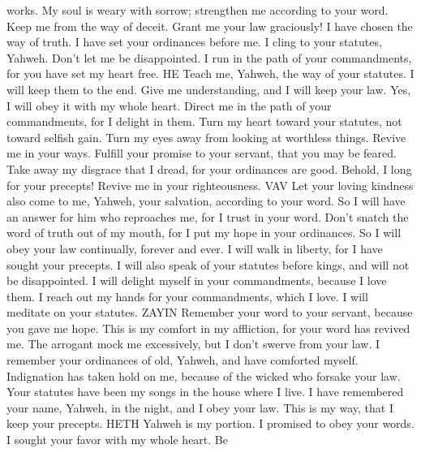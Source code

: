 works.  My soul is weary with sorrow; strengthen me
according to your word.  Keep me from the way of deceit.
Grant me your law graciously!  I have chosen the way of
truth. I have set your ordinances before me.  I cling to
your statutes, Yahweh. Don't let me be disappointed.  I
run in the path of your commandments, for you have set my heart free. HE
 Teach me, Yahweh, the way of your statutes. I will keep
them to the end.  Give me understanding, and I will keep
your law. Yes, I will obey it with my whole heart. 
Direct me in the path of your commandments, for I delight in them.
 Turn my heart toward your statutes, not toward selfish
gain.  Turn my eyes away from looking at worthless
things. Revive me in your ways.  Fulfill your promise to
your servant, that you may be feared.  Take away my
disgrace that I dread, for your ordinances are good. 
Behold, I long for your precepts! Revive me in your righteousness. VAV
 Let your loving kindness also come to me, Yahweh, your
salvation, according to your word.  So I will have an
answer for him who reproaches me, for I trust in your word.
 Don't snatch the word of truth out of my mouth, for I
put my hope in your ordinances.  So I will obey your law
continually, forever and ever.  I will walk in liberty,
for I have sought your precepts.  I will also speak of
your statutes before kings, and will not be disappointed.
 I will delight myself in your commandments, because I
love them.  I reach out my hands for your commandments,
which I love. I will meditate on your statutes. ZAYIN 
Remember your word to your servant, because you gave me hope.
 This is my comfort in my affliction, for your word has
revived me.  The arrogant mock me excessively, but I
don't swerve from your law.  I remember your ordinances
of old, Yahweh, and have comforted myself.  Indignation
has taken hold on me, because of the wicked who forsake your law.
 Your statutes have been my songs in the house where I
live.  I have remembered your name, Yahweh, in the night,
and I obey your law.  This is my way, that I keep your
precepts. HETH  Yahweh is my portion. I promised to obey
your words.  I sought your favor with my whole heart. Be

